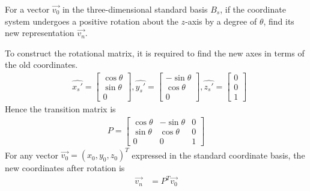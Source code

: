 \begin{exmp}
For a vector $\vec{v_0}$ in the three-dimensional standard basis $B_s$, if the coordinate system undergoes a positive rotation about the $z$-axis by a degree of $\theta$, find its new representation $\vec{v_n}$.

\begin{center}
\end{center}
To construct the rotational matrix, it is required to find the new axes in terms of the old coordinates.
\begin{align*}
& \hat{x_s'} =
\begin{bmatrix}
\cos \theta \\
\sin \theta \\
0
\end{bmatrix},
\hat{y_s'} =
\begin{bmatrix}
-\sin \theta \\
\cos \theta \\
0
\end{bmatrix},
\hat{z_s'} =
\begin{bmatrix}
0 \\
0 \\
1
\end{bmatrix}
\end{align*}
Hence the transition matrix is
\begin{align*}
P =
\begin{bmatrix}
\cos \theta & -\sin \theta & 0 \\
\sin \theta & \cos \theta & 0 \\
0 & 0 & 1
\end{bmatrix}
\end{align*}
For any vector $\vec{v_0} = (x_0,y_0,z_0)^T$ expressed in the standard coordinate basis, the new coordinates after rotation is
\begin{align*}
\vec{v_n} &= P^T\vec{v_0} \\

\end{align*}
\end{exmp}
